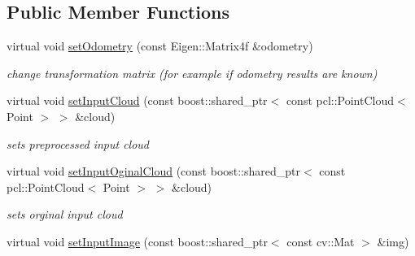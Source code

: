 \subsection*{Public Member Functions}
\begin{DoxyCompactItemize}
\item 
\hypertarget{classGeneralRegistration_a13eb99cd3da37c3bea5c0f0804eb464c}{
virtual void \hyperlink{classGeneralRegistration_a13eb99cd3da37c3bea5c0f0804eb464c}{setOdometry} (const Eigen::Matrix4f \&odometry)}
\label{classGeneralRegistration_a13eb99cd3da37c3bea5c0f0804eb464c}

\begin{DoxyCompactList}\small\item\em change transformation matrix (for example if odometry results are known) \item\end{DoxyCompactList}\item 
\hypertarget{classGeneralRegistration_ac4d5bfb0b8e14945ec99708093e63bd7}{
virtual void \hyperlink{classGeneralRegistration_ac4d5bfb0b8e14945ec99708093e63bd7}{setInputCloud} (const boost::shared\_\-ptr$<$ const pcl::PointCloud$<$ Point $>$ $>$ \&cloud)}
\label{classGeneralRegistration_ac4d5bfb0b8e14945ec99708093e63bd7}

\begin{DoxyCompactList}\small\item\em sets preprocessed input cloud \item\end{DoxyCompactList}\item 
\hypertarget{classGeneralRegistration_a8bd91517840e7a1b075814944ae34451}{
virtual void \hyperlink{classGeneralRegistration_a8bd91517840e7a1b075814944ae34451}{setInputOginalCloud} (const boost::shared\_\-ptr$<$ const pcl::PointCloud$<$ Point $>$ $>$ \&cloud)}
\label{classGeneralRegistration_a8bd91517840e7a1b075814944ae34451}

\begin{DoxyCompactList}\small\item\em sets orginal input cloud \item\end{DoxyCompactList}\item 
\hypertarget{classGeneralRegistration_a627f43f8f614954e66a0328dbd7ea539}{
virtual void \hyperlink{classGeneralRegistration_a627f43f8f614954e66a0328dbd7ea539}{setInputImage} (const boost::shared\_\-ptr$<$ const cv::Mat $>$ \&img)}
\label{classGeneralRegistration_a627f43f8f614954e66a0328dbd7ea539}


\end{DoxyCompactItemize}
